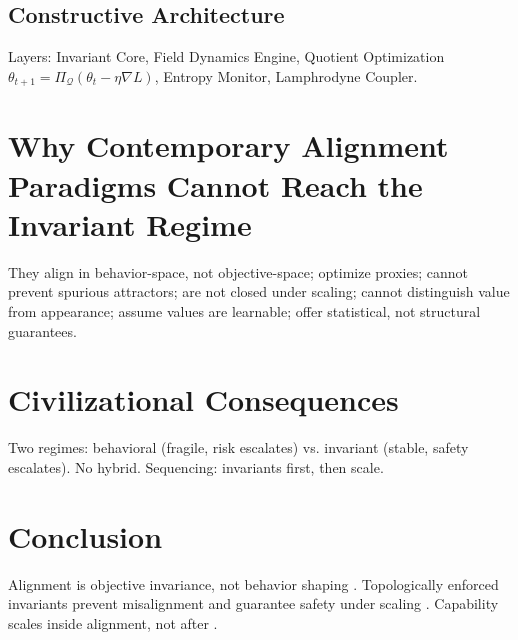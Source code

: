 \documentclass[11pt,a4paper]{article}
\theoremstyle{plain}
\begin{document}
\subsection{Constructive Architecture}
Layers: Invariant Core, Field Dynamics Engine, Quotient Optimization $\theta_{t+1} = \Pi_{\mathcal{Q}}(\theta_t - \eta \nabla L)$, Entropy Monitor, Lamphrodyne Coupler.

\section{Why Contemporary Alignment Paradigms Cannot Reach the Invariant Regime}

They align in behavior-space, not objective-space; optimize proxies; cannot prevent spurious attractors; are not closed under scaling; cannot distinguish value from appearance; assume values are learnable; offer statistical, not structural guarantees.

\section{Civilizational Consequences}

Two regimes: behavioral (fragile, risk escalates) vs. invariant (stable, safety escalates). No hybrid. Sequencing: invariants first, then scale.

\section{Conclusion}

Alignment is objective invariance, not behavior shaping \cite{weidinger2022,olah2020}. Topologically enforced invariants prevent misalignment and guarantee safety under scaling \cite{weidinger2022,olah2020}. Capability scales inside alignment, not after \cite{olah2020}.
\end{document}
